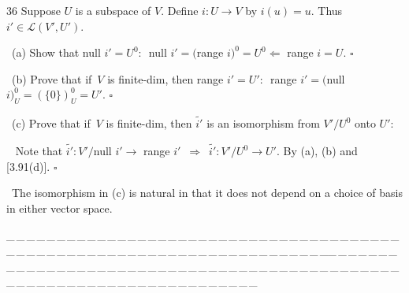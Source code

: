 \documentclass[a4paper, 11pt, UTF8]{article}
\def\Lm{\mathcal{L}}
\begin{document}
\begin{large}
{\timesbf\Large 36} {\timessl\Large 
Suppose $U$ is a subspace of $V$. Define $i:U\rightarrow V$  by $i(u)=u$. Thus $i'\in\Lm(V',U').$}\par\quad\,
(a) {\timessl\Large Show that null $i'=U^0$:\,\,\,\,{\large null $i'=($range $i)^0=U^0\Leftarrow$ range $i=U$. $\square$}}\par\quad\,
(b) {\timessl\Large Prove that if $\,V$ is {finite-dim}, then range $i'=U'$:\,\,\,\,{\large range $i'=($null $i)_{U}^0=(\{0\})_U^0=U'$. $\square$}}\par\quad\,
(c) {\timessl\Large Prove that if $\,V$ is finite-dim, then $\tilde{i'}$ is an isomorphism from $V'/U^0$ onto $U'$:}\par\qquad\,\,\,
Note that $\tilde{i'}:V'/$null $i'\rightarrow$ range $i'\,\,\,\Rightarrow\,\,\,\tilde{i'}:V'/U^0\rightarrow U'$. By (a), (b) and [3.91(d)]. $\square$\par\quad\,
{\timessl\normalsize The isomorphism in (c) is natural in that it does not depend on a choice of basis in either vector space.}\par
{\tiny \_\,\_\,\_\,\_\,\_\,\_\,\_\,\_\,\_\,\_\,\_\,\_\,\_\,\_\,\_\,\_\,\_\,\_\,\_\,\_\,\_\,\_\,\_\,\_\,\_\,\_\,\_\,\_\,\_\,\_\,\_\,\_\,\_\,\_\,\_\,\_\,\_\,\_\,\_\,\_\,\_\,\_\,\_\,\_\,\_\,\_\,\_\,\_\,\_\,\_\,\_\,\_\,\_\,\_\,\_\,\_\,\_\,\_\,\_\,\_\,\_\,\_\,\_\,\_\,\_\,\_\,\_\,\_\,\_\,\_\,\_\_\,\_\,\_\,\_\,\_\,\_\,\_\,\_\,\_\,\_\,\_\,\_\,\_\,\_\,\_\,\_\,\_\,\_\,\_\,\_\,\_\,\_\,\_\,\_\,\_\,\_\,\_\,\_\,\_\,\_\,\_\,\_\,\_\,\_\,\_\,\_\,\_\,\_\,\_\,\_\,\_\,\_\,\_\,\_\,\_\,\_\,\_\,\_\,\_\,\_\,\_\,\_\,\_\,\_\,\_\,\_\,\_\,\_\,\_\,\_\,\_\,\_\,\_\,\_\,\_\,\_\,\_\,\_\,\_\,\_\,\_}\par


\end{large}
\end{document}
